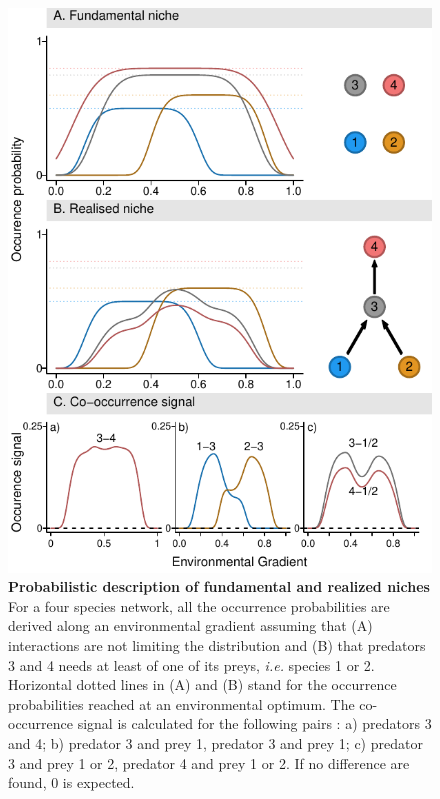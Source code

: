 \begin{figure}
\centering
\includegraphics{chapitre3/figConcept.pdf}
\caption{\textbf{Probabilistic description of fundamental and realized
niches} For a four species network, all the occurrence probabilities are
derived along an environmental gradient assuming that (A) interactions
are not limiting the distribution and (B) that predators 3 and 4 needs
at least of one of its preys, \emph{i.e.} species 1 or 2. Horizontal
dotted lines in (A) and (B) stand for the occurrence probabilities
reached at an environmental optimum. The co-occurrence signal is
calculated for the following pairs : a) predators 3 and 4; b) predator 3
and prey 1, predator 3 and prey 1; c) predator 3 and prey 1 or 2,
predator 4 and prey 1 or 2. If no difference are found, 0 is
expected.\label{fig:box1}}
\end{figure}

\newpage

